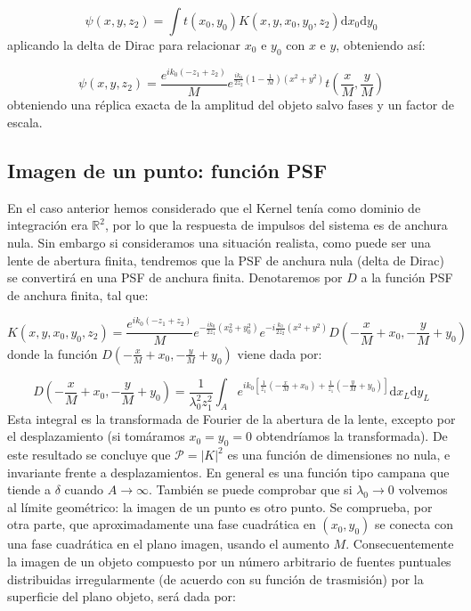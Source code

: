 \documentclass[12pt,a4paper]{book}
\numberwithin{equation}{section}
\numberwithin{figure}{section}
\newcommand{\parentesis}[1]{\left( #1  \right)}
\newcommand{\ccorchetes}[1]{\left[ #1  \right]}
\newcommand{\D}{\mathrm{d}}
\newcommand{\1}{_{(1)}}
\newcommand{\2}{_{(2)}}
\theoremstyle{definition}
\begin{document}
\begin{equation}
    \psi (x,y,z_2) = \int t(x_0,y_0) K (x,y,x_0,y_0,z_2) \D x_0 \D y_0 
\end{equation}
aplicando la delta de Dirac para relacionar $x_0$ e $y_0$ con $x$ e $y$, obteniendo así:

\begin{equation}
    \psi (x,y,z_2) = \frac{e^{ik_0 (-z_1+z_2)}}{M} e^{\frac{ik_0}{2z_2} \parentesis{1-\frac{1}{M}}(x^2+y^2)} t\parentesis{\frac{x}{M},\frac{y}{M}}
\end{equation}
obteniendo una réplica exacta de la amplitud del objeto salvo fases y un factor de escala.

\subsection{Imagen de un punto: función PSF}

En el caso anterior hemos considerado que el Kernel tenía como dominio de integración era $\mathbb{R}^2$, por lo que la respuesta de impulsos del sistema es de anchura nula. Sin embargo si consideramos una situación realista, como puede ser una lente de abertura finita, tendremos que la PSF de anchura nula (delta de Dirac) se convertirá en una PSF de anchura finita. Denotaremos por $D$ a la función PSF de anchura finita, tal que:

\begin{equation}
    K(x,y,x_0,y_0,z_2)=\frac{e^{ik_0(-z_1+z_2)}}{M} e^{-\frac{ik_0}{2z_1}(x_0^2+y_0^2)} e^{-i\frac{k_0}{2z_2}(x^2+y^2)} D\parentesis{-\frac{x}{M}+x_0,-\frac{y}{M}+y_0}
\end{equation}
donde la función $D\parentesis{-\frac{x}{M}+x_0,-\frac{y}{M}+y_0}$ viene dada por:

\begin{equation}
    D\parentesis{-\frac{x}{M}+x_0,-\frac{y}{M}+y_0} = \frac{1}{\lambda_0^2z_1^2} \int_A e^{ik_0\ccorchetes{\frac{1}{z_1}\parentesis{-\frac{x}{M}+x_0} + \frac{1}{z_1}\parentesis{-\frac{y}{M}+y_0}}} \D x_L \D y_L
\end{equation}
Esta integral es la transformada de Fourier de la abertura de la lente, excepto por el desplazamiento (si tomáramos $x_0=y_0=0$ obtendríamos la transformada). De este  resultado se concluye que $\mathcal{P}=|K|^2$ es una función de dimensiones no nula, e invariante frente a desplazamientos. En general es una función tipo campana que tiende a $\delta$ cuando $A \rightarrow \infty$. También se puede comprobar que si $\lambda_0 \rightarrow 0$ volvemos al límite geométrico: la imagen de un punto es otro punto. Se comprueba, por otra parte, que aproximadamente una fase cuadrática en $(x_0,y_0)$ se conecta con una fase cuadrática en el plano imagen, usando el aumento $M$. Consecuentemente la imagen de un objeto compuesto por un número arbitrario de fuentes puntuales distribuidas irregularmente (de acuerdo con su función de trasmisión) por la superficie del plano objeto, será dada por: 
\end{document}
